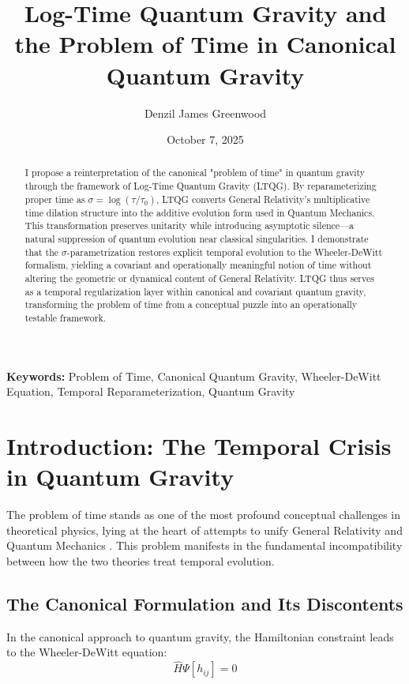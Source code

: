 \documentclass[12pt,a4paper]{article}
\title{\textbf{Log-Time Quantum Gravity and the Problem of Time in Canonical Quantum Gravity}}
\author[1]{Denzil James Greenwood}
\affil[1]{Independent Researcher}
\date{October 7, 2025}
\begin{document}
\maketitle

\begin{abstract}
I propose a reinterpretation of the canonical "problem of time" in quantum gravity through the framework of Log-Time Quantum Gravity (LTQG). By reparameterizing proper time as $\sigma = \log(\tau/\tau_0)$, LTQG converts General Relativity's multiplicative time dilation structure into the additive evolution form used in Quantum Mechanics. This transformation preserves unitarity while introducing asymptotic silence—a natural suppression of quantum evolution near classical singularities. I demonstrate that the $\sigma$-parametrization restores explicit temporal evolution to the Wheeler-DeWitt formalism, yielding a covariant and operationally meaningful notion of time without altering the geometric or dynamical content of General Relativity. LTQG thus serves as a temporal regularization layer within canonical and covariant quantum gravity, transforming the problem of time from a conceptual puzzle into an operationally testable framework.
\end{abstract}

\textbf{Keywords:} Problem of Time, Canonical Quantum Gravity, Wheeler-DeWitt Equation, Temporal Reparameterization, Quantum Gravity

\section{Introduction: The Temporal Crisis in Quantum Gravity}

The problem of time stands as one of the most profound conceptual challenges in theoretical physics, lying at the heart of attempts to unify General Relativity and Quantum Mechanics \cite{Kiefer2012,Kuchar1992}. This problem manifests in the fundamental incompatibility between how the two theories treat temporal evolution.

\subsection{The Canonical Formulation and Its Discontents}

In the canonical approach to quantum gravity, the Hamiltonian constraint leads to the Wheeler-DeWitt equation:
\begin{equation}
\hat{H} \Psi[h_{ij}] = 0
\label{eq:wdw_constraint}
\end{equation}
\end{document}
